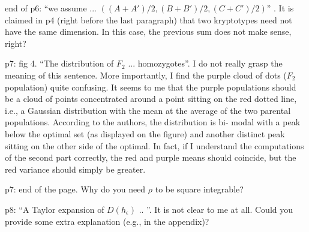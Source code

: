 
\begin{point}{end of p6:} 
    ``we assume ... $((A + A' )/2, (B + B' )/2, (C + C' )/2)$'' . It is claimed in p4 (right
before the last paragraph) that two kryptotypes need not have the same dimension. In this
case, the previous sum does not make sense, right?
\end{point}


\begin{point}{p7: fig 4.}
    ``The distribution of $F_2$ ... homozygotes''. I do not really grasp the meaning of this
sentence. More importantly, I find the purple cloud of dots ($F_2$ population) quite confusing.
It seems to me that the purple populations should be a cloud of points concentrated around
a point sitting on the red dotted line, i.e., a Gaussian distribution with the mean at the
average of the two parental populations. According to the authors, the distribution is bi-
modal with a peak below the optimal set (as displayed on the figure) and another distinct
peak sitting on the other side of the optimal. In fact, if I understand the computations of
the second part correctly, the red and purple means should coincide, but the red variance
should simply be greater.
\end{point}


\begin{point}{p7: end of the page.}
    Why do you need $\rho$ to be square integrable?
\end{point}


\begin{point}{p8:}
    ``A Taylor expansion of $D(h_\epsilon)$ .. ''. It is not clear to me at all. Could you provide some
extra explanation (e.g., in the appendix)?
\end{point}


